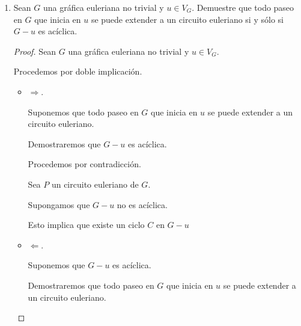 \documentclass{article}
\begin{document}
\begin{enumerate}
\begin{proof}
    Como en cualquiera de los casos anteriores hay una cantidad par de fichas, entonces podemos agrupar
    conjuntos [aristas] de orden $2$ con las fichas [vértices] y obtendremos una gráfica par, pues cada
    ficha se relacionará con exactamente $2$, luego, los ordenes $n$ en el dominó, siempre que $n$ sea
    par, forman gráficas eulerianas, luego por el teorema de caracterización de gráficas eulerianas tenemos
    que esta es un ciclo.
  \end{proof}
\item Sean $G$ una gr\'afica euleriana no trivial
  y $u \in V_G$. Demuestre que todo paseo en $G$
  que inicia en $u$ se puede extender a un circuito
  euleriano si y s\'olo si $G-u$ es ac\'iclica.

  \begin{proof}
    Sean $G$ una gr\'afica euleriana no trivial y $u \in V_{G}$.

    Procedemos por doble implicación.

    \begin{itemize}
    \item $\Longrightarrow$.

      Suponemos que todo paseo en $G$ que inicia en $u$ se puede extender a un circuito euleriano.

      Demostraremos que $G-u$ es ac\'iclica.

      Procedemos por contradicción.

      Sea $P$ un circuito euleriano de $G$.

      Supongamos que $G-u$ no es ac\'iclica.

      Esto implica que existe un ciclo $C$ en $G-u$

    \item $\Longleftarrow$.

      Suponemos que $G-u$ es ac\'iclica.

      Demostraremos que todo paseo en $G$ que inicia en $u$ se puede extender a un circuito euleriano.
    \end{itemize}
  \end{proof}
\end{enumerate}
\end{document}
